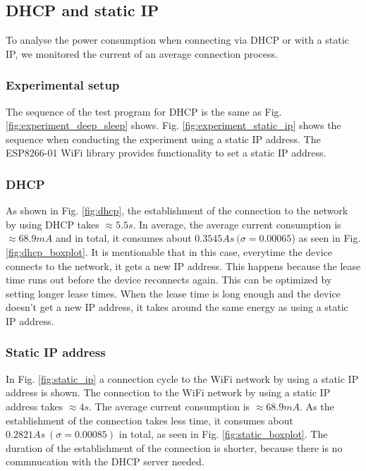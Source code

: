 \subsection{DHCP and static IP}
To analyse the power consumption when connecting via DHCP or with a static IP, we monitored the current of an average connection process.\\

\subsubsection{Experimental setup}
The sequence of the test program for DHCP is the same as Fig. \ref{fig:experiment_deep_sleep} shows.
Fig. \ref{fig:experiment_static_ip} shows the sequence when conducting the experiment using a static IP address.
The ESP8266-01 WiFi library provides functionality to set a static IP address.\\

\subsubsection{DHCP}
As shown in Fig. \ref{fig:dhcp}, the establishment of the connection to the network by using DHCP takes $\approx 5.5 s$.
In average, the average current consumption is $\approx 68.9 mA$ and in total, it consumes about $0.3545 As\ (\sigma = 0.00065$) as seen in Fig. \ref{fig:dhcp_boxplot}.
It is mentionable that in this case, everytime the device connects to the network, it gets a new IP address.
This happens because the lease time runs out before the device reconnects again.
This can be optimized by setting longer lease times.
When the lease time is long enough and the device doesn't get a new IP address, it takes around the same energy as using a static IP address.\\

\subsubsection{Static IP address}
In Fig. \ref{fig:static_ip} a connection cycle to the WiFi network by using a static IP address is shown.
The connection to the WiFi network by using a static IP address takes $\approx 4 s$.
The average current consumption is $\approx 68.9 mA$.
As the establishment of the connection takes less time, it consumes about $0.2821 As\ (\sigma = 0.00085)$  in total, as seen in Fig. \ref{fig:static_boxplot}.
The duration of the establishment of the connection is shorter, because there is no commnucation with the DHCP server needed.


